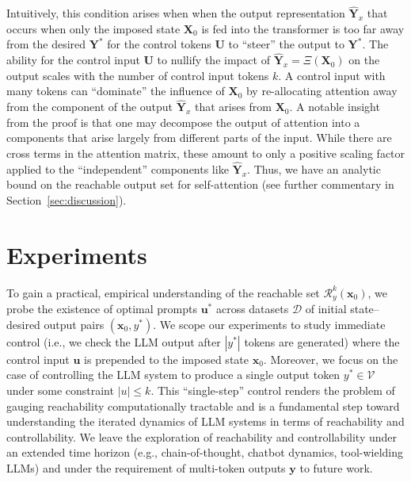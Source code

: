 \documentclass{article} %
\begin{document}
Intuitively, this condition arises when when the output representation $\hat{\mathbf Y}_x$ that occurs when only the imposed state $\mathbf X_0$ is fed into the transformer is too far away from the desired $\mathbf Y^*$ for the control tokens $\mathbf U$ to ``steer'' the output to $\mathbf Y^*$. 
The ability for the control input $\mathbf U$ to nullify the impact of $\hat{\mathbf Y}_x = \Xi(\mathbf X_0)$ on the output scales with the number of control input tokens $k$. A control input with many tokens can ``dominate'' the influence of $\mathbf X_0$ by re-allocating attention away from the component of the output $\hat{\mathbf Y}_x$ that arises from $\mathbf X_0$. 
A notable insight from the proof is that one may decompose the output of attention into a components that arise largely from different parts of the input. While there are cross terms in the attention matrix, these amount to only a positive scaling factor applied to the ``independent'' components like $\hat{\mathbf Y}_x$.
Thus, we have an analytic bound on the reachable output set for self-attention (see further commentary in Section~\ref{sec:discussion}). 



\section{Experiments}

To gain a practical, empirical understanding of the reachable set $\mathcal R_y^k(\mathbf x_0)$, we probe the existence of optimal prompts $\mathbf u^*$ across datasets $\mathcal D$ of initial state--desired output pairs $(\mathbf x_0, y^*)$. 
We scope our experiments to study immediate control (i.e., we check the LLM output after $|y^*|$ tokens are generated) where the control input $\mathbf u$ is prepended to the imposed state $\mathbf x_0$. 
Moreover, we focus on the case of controlling the LLM system to produce a single output token $y^* \in \mathcal V$ under some constraint $|u| \leq k$.
This ``single-step'' control renders the problem of gauging reachability computationally tractable and is a fundamental step toward understanding the iterated dynamics of LLM systems in terms of reachability and controllability. 
We leave the exploration of reachability and controllability under an extended time horizon (e.g., chain-of-thought, chatbot dynamics, tool-wielding LLMs) and under the requirement of multi-token outputs $\mathbf y$ to future work. 
\end{document}
